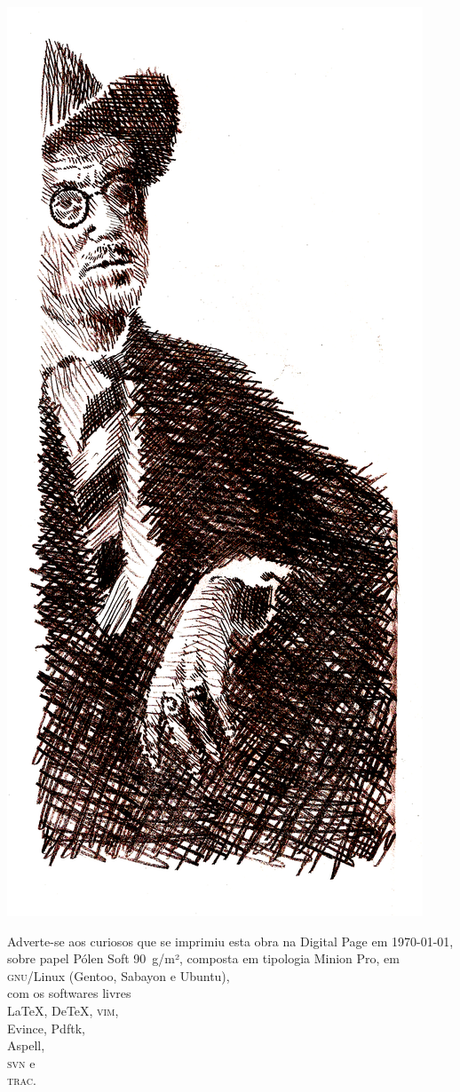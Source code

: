 \pagebreak
\ifodd\thepage\blank\else\relax\fi

\thispagestyle{empty}
\mbox{}\vfill

\begin{center}
\includegraphics[width=.5\textwidth]{joyce2.jpg}
\end{center}

\mbox{}\vfill

\begin{adjustwidth}{.15\textwidth}{.15\textwidth}
{\noindent\centering\footnotesize
Adverte-se aos curiosos que se imprimiu esta obra na Digital Page
em \today, sobre papel%
Pólen Soft 90~g/m²,
composta em tipologia Minion Pro, em\\ \textsc{gnu}/Linux
(Gentoo, Sabayon e Ubuntu),\\ com os softwares livres\\
\LaTeX, De\TeX, \textsc{vim},\\ Evince, Pdftk,\\
Aspell,\\ \textsc{svn} e\\ \textsc{trac}.\par}
\end{adjustwidth}


